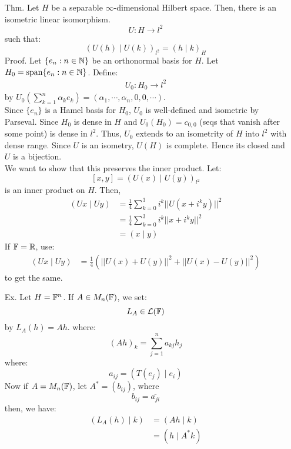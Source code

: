 \documentclass[12pt]{article}
\begin{document}
\begin{itemize}
    (4) $\implies$ (5). Let $k = h$. \\
    (5) $\implies$ (1). Suppose $w_0 = \overline{\opspan\{e_n\}} \neq H$. Then, $\exists h \in H \setminus \{0\}$ such that $(h|e_n) = 0$ for all $n \in \N$. \\
    Missed one line. 
    \item[Thm.] Let $H$ be a separable $\infty$-dimensional Hilbert space. Then, there is an isometric linear isomorphism. 
    \[ U: H \to l^2\]
    such that: 
    \[ (U(h) \mid U(k))_{l^2} = (h\mid k)_H\] 
    Proof. Let $\{e_n : n \in \mathbb N\}$ be an orthonormal basis for $H$. Let $H_0 = \operatorname{span}\{e_n : n \in \mathbb N\}$. Define: 
    \begin{align*}
        U_0: H_0 \to l^2 
    \end{align*}
    by $U_0\left(\sum_{k=1}^n \alpha_k e_k\right) = (\alpha_1, \cdots, \alpha_n, 0, 0, \cdots)$. \\
    Since $\{e_n\}$ is a Hamel basis for $H_0$, $U_0$ is well-defined and isometric by Parseval. Since $H_0$ is dense in $H$ and $U_0(H_0) = c_{0,0}$ (seqs that vanish after some point) is dense in $l^2$. Thus, $U_0$ extends to an isometrity of $H$ into $l^2$ with dense range. Since $U$ is an isometry, $U(H)$ is complete. Hence its closed and $U$ is a bijection. \\
    We want to show that this preserves the inner product. Let: 
    \[ [x, y] = (U(x) \mid U(y))_{l^2}\]
    is an inner product on $H$. Then, 
    \begin{align*}
        (U x \mid U y) &= \frac14 \sum_{k=0}^3 i^k ||U(x + i^k y)||^2 \\
        &= \frac14 \sum_{k=0}^3 i^k ||x + i^k y||^2 \\
        &= (x \mid y)
    \end{align*}
    If $\mathbb F = \mathbb R$, use: 
    \begin{align*}
        (U x \mid U y) &= \frac14 (||U(x)+U(y)||^2 + ||U(x)-U(y)||^2)
    \end{align*}
    to get the same. 
    \item[Ex.] Let $H = \mathbb F^n$. If $A \in M_n(\mathbb F)$, we set: 
    \[ L_A \in \mathcal L(\mathbb F)\]
    by $L_A(h) = Ah$. where:
    \[ (Ah)_k = \sum_{j=1}^n a_{kj}h_j\]
    where: 
    \[ a_{ij} = (T(e_j)\mid e_i)\]
    Now if $A = M_n(\mathbb F)$, let $A^* = (b_{ij})$, where 
    \[ b_{ij} = \overline{a_{ji}}\]
    then, we have:
    \begin{align*}
        (L_A(h) \mid k) &= (Ah \mid k) \\
        &= (h \mid A^*k) \\

\end{align*}
\end{itemize}
\end{document}
